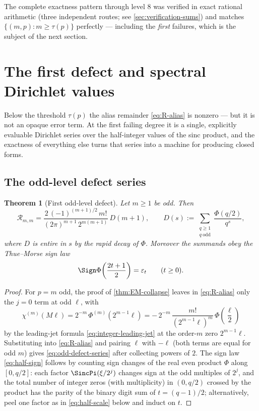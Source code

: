 \documentclass[11pt,oneside]{article}
\numberwithin{equation}{section}
\newtheorem{theorem}{Theorem}[section]
\theoremstyle{definition}
\theoremstyle{remark}
\newcommand{\eps}{\varepsilon}
\newcommand{\defect}{\mathcal R}
\begin{document}
The complete exactness pattern through level $8$ was verified in exact
rational arithmetic (three independent routes; see
\cref{sec:verification-sums}) and matches
$\{(m,p):m\ge\tau(p)\}$ perfectly --- including the \emph{first}
failures, which is the subject of the next section.

\section{The first defect and spectral Dirichlet values}
\label{sec:dirichlet}

Below the threshold $\tau(p)$ the alias remainder \eqref{eq:R-alias}
is nonzero --- but it is not an opaque error term.  At the first
failing degree it is a single, explicitly evaluable Dirichlet series
over the half-integer values of the sinc product, and the exactness of
everything else turns that series into a machine for producing closed
forms.

\subsection{The odd-level defect series}

\begin{theorem}[First odd-level defect]
\label{thm:odd-defect}
Let $m\ge1$ be odd.  Then
\begin{equation}
 \boxed{\;
 \defect_{m,m}
 =\frac{2\,(-1)^{(m+1)/2}\,m!}
 {(2\pi)^{m+1}\,2^{m(m+1)}}\,
 D(m+1),
 \qquad
 D(s):=\sum_{\substack{q\ge1\\ q\ \mathrm{odd}}}
 \frac{\Phi(q/2)}{q^{s}},
 \;}
 \label{eq:odd-defect-series}
\end{equation}
where $D$ is entire in $s$ by the rapid decay of $\Phi$.  Moreover the
summands obey the Thue--Morse sign law
\begin{equation}
 \Sign\Phi\!\left(\frac{2t+1}{2}\right)=\eps_t
 \qquad(t\ge0).
 \label{eq:half-sign}
\end{equation}
\end{theorem}

\begin{proof}
For $p=m$ odd, the proof of \cref{thm:EM-collapse} leaves in
\eqref{eq:R-alias} only the $j=0$ term at odd $\ell$, with
\[
 \chi^{(m)}(M\ell)
 =2^{-m}\,\Phi^{(m)}\!\left(2^{m-1}\ell\right)
 =-\,2^{-m}\,\frac{m!}{(2^{m-1}\ell)^{m}}\,
 \Phi\!\left(\frac{\ell}{2}\right)
\]
by the leading-jet formula \eqref{eq:integer-leading-jet} at the
order-$m$ zero $2^{m-1}\ell$.  Substituting into \eqref{eq:R-alias}
and pairing $\ell$ with $-\ell$ (both terms are equal for odd $m$)
gives \eqref{eq:odd-defect-series} after collecting powers of $2$.
The sign law \eqref{eq:half-sign} follows by counting sign changes of
the real even product $\Phi$ along $[0,q/2]$: each factor
$\SincPi(\xi/2^{j})$ changes sign at the odd multiples of $2^{j}$, and
the total number of integer zeros (with multiplicity) in $(0,q/2)$
crossed by the product has the parity of the binary digit sum of
$t=(q-1)/2$; alternatively, peel one factor as in
\eqref{eq:half-scale} below and induct on $t$.
\end{proof}
\end{document}
